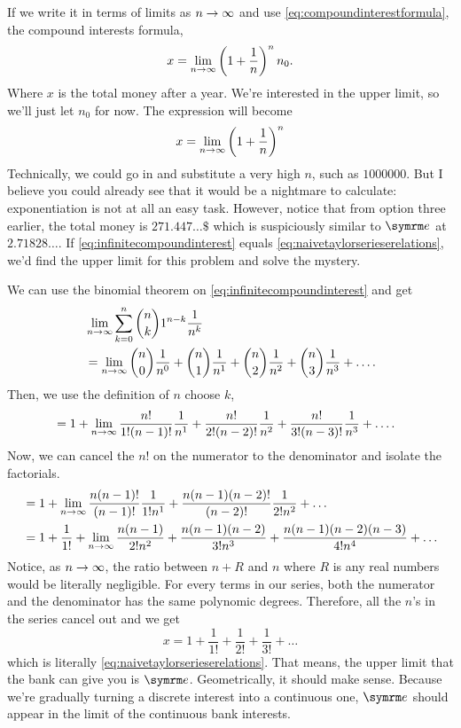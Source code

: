 If we write it in terms of limits as $n \rightarrow \infty$ and use \cref{eq:compoundinterestformula}, the compound interests formula,
\begin{equation*}
    x = \lim_{n \rightarrow \infty}\left(1 + \frac{1}{n}\right)^nn_0.
\end{equation*}
Where $x$ is the total money after a year. We're interested in the upper limit, so we'll just let $n_0$ for now. The expression will become
\begin{equation}
    x = \lim_{n \rightarrow \infty}\left(1 + \frac{1}{n}\right)^n \label{eq:infinitecompoundinterest}
\end{equation}
Technically, we could go in and substitute a very high $n$, such as $1000000$. But I believe you could already see that it would be a nightmare to calculate: exponentiation is not at all an easy task. However, notice that from option three earlier, the total money is $271.447\dots\$$ which is suspiciously similar to $\e$ at $2.71828\dots$. If \cref{eq:infinitecompoundinterest} equals \cref{eq:naivetaylorserieserelations}, we'd find the upper limit for this problem and solve the mystery.

We can use the binomial theorem on \cref{eq:infinitecompoundinterest} and get
\begin{align*}
    &\lim_{n \rightarrow \infty}\sum_{k = 0}^{n}{n \choose k}1^{n - k}\frac{1}{n^k} \\
    &= \lim_{n \rightarrow \infty}{n \choose 0}\frac{1}{n^0} + {n \choose 1}\frac{1}{n^1} + {n \choose 2}\frac{1}{n^2} + {n \choose 3}\frac{1}{n^3} + \dots.
\end{align*}
Then, we use the definition of $n$ choose $k$,
\begin{align*}
    &= 1 + \lim_{n \rightarrow \infty}\frac{n!}{1!(n - 1)!}\frac{1}{n^1} + \frac{n!}{2!(n - 2)!}\frac{1}{n^2} + \frac{n!}{3!(n - 3)!}\frac{1}{n^3} + \dots.
\end{align*}
Now, we can cancel the $n!$ on the numerator to the denominator and isolate the factorials.
\begin{align*}
    &= 1 + \lim_{n \rightarrow \infty}\frac{n(n - 1)!}{(n - 1)!}\frac{1}{1!n^1} + \frac{n(n - 1)(n - 2)!}{(n - 2)!}\frac{1}{2!n^2} + \dots \\
    &= 1 + \frac{1}{1!} + \lim_{n \rightarrow \infty} \frac{n(n - 1)}{2!n^2} + \frac{n(n - 1)(n - 2)}{3!n^3} + \frac{n(n - 1)(n - 2)(n - 3)}{4!n^4} + \dots
\end{align*}
Notice, as $n \rightarrow \infty$, the ratio between $n + R$ and $n$ where $R$ is any real numbers would be literally negligible. For every terms in our series, both the numerator and the denominator has the same polynomic degrees. Therefore, all the $n$'s in the series cancel out and we get
\begin{equation}
    x = 1 + \frac{1}{1!} + \frac{1}{2!} + \frac{1}{3!} + \dots
\end{equation}
which is literally \cref{eq:naivetaylorserieserelations}. That means, the upper limit that the bank can give you is $\e$. Geometrically, it should make sense. Because we're gradually turning a discrete interest into a continuous one, $\e$ should appear in the limit of the continuous bank interests.

